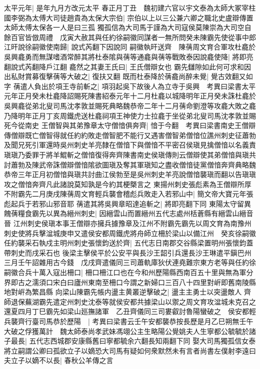 太平元年|{
	是年九月方改元太平}
春正月丁丑　魏初建六官以宇文泰為太師大冢宰柱國李弼為太傅大司徒趙貴為太保大宗伯|{
	宗伯以上以三公兼六卿之職北史盧辯傳置太師太傅太保各一人是曰三孤}
獨孤信為大司馬于謹為大司寇侯莫陳崇為大司空自餘百官皆倣周禮　戊寅大赦其與任約徐嗣徽同謀者一無所問癸未陳霸先使從事中郎江旰說徐嗣徽使南歸|{
	說式芮翻下因說同}
嗣徽執旰送齊　陳蒨周文育合軍攻杜龕於吳興龕勇而無謀嗜酒常醉其將杜泰隂與蒨等通龕與蒨等戰敗泰因說龕使降|{
	將即亮翻說式芮翻降戶江翻}
龕然之其妻王氏曰|{
	王氏僧辯女也}
霸先讎隙如此何可求和因出私財賞募復擊蒨等大破之|{
	復扶又翻}
既而杜泰降於蒨龕尚醉未覺|{
	覺古效翻又如字}
蒨遣人負出於項王寺前斬之|{
	項羽起吳下故後人為立寺于吳興　考異曰梁書太平元年正月癸未杜龕降詔賜死陳書紹泰元年十二月杜龕以城降明年正月癸未誅杜龕於吳興龕從弟北叟司馬沈孝敦並賜死典略魏恭帝二年十二月蒨命劉澄等攻龕大敗之龕乃降明年正月丁亥周鐵虎送杜龕祠項王神使力士拉龕于坐從弟北叟司馬沈孝敦並賜死今從南史}
王僧智與其弟豫章太守僧愔俱奔齊|{
	愔于今翻　考異曰梁書南史王僧辯傳僧辯既亡僧智得就任約約敗走僧智肥不能行又遇害僧智弟僧愔位譙州刺史征蕭勃及聞兄死引軍還時吳州刺史羊亮隸在僧愔下與僧愔不平密召侯瑱見擒僧愔以名義責瑱瑱乃委罪于將羊鯤斬之僧愔復得奔齊陳書南史侯瑱傳則云僧辯使其弟僧愔與瑱共討蕭勃及陳武帝誅僧辯僧愔隂欲圖瑱及奪其軍瑱知之盡收僧愔徒黨僧愔奔齊典略魏恭帝三年正月初僧愔與瑱共討曲江侯勃至是吳州刺史羊亮說僧愔襲瑱而翻以告瑱瑱攻之僧愔奔齊凡此諸說莫知孰是今約其梗槩言之}
東揚州刺史張彪素為王僧辯所厚不附霸先二月庚戌陳蒨周文育輕兵襲會稽彪兵敗走入若邪山中|{
	簡文帝大寶元年張彪起兵于若邪山邪音耶}
蒨遣其將吳興章昭達追斬之|{
	將即亮翻下同}
東陽太守留異餽蒨糧食霸先以異為縉州刺史|{
	因縉雲山而置縉州五代志處州栝蒼縣有縉雲山縉音晉}
江州刺史侯瑱本事王僧辯亦擁兵據豫章及江州不附霸先霸先以周文育為南豫州刺史使將兵擊湓城庚申又遣侯安都周鐵虎將舟師立柵於梁山以備江州　癸亥徐嗣徽任約襲采石執戍主明州刺史張懷鈞送於齊|{
	五代志日南郡交谷縣梁置明州張懷鈞蓋帶刺史而戌采石也}
後梁主擊侯平於公安平與長沙王韶引兵還長沙王琳遣平鎭巴州三月壬午詔雜用古今錢　戊戌齊遣儀同三司蕭軌庫狄伏連堯難宗東方老等與任約徐嗣徽合兵十萬入寇出柵口|{
	柵口柵江口也在今和州歷陽縣西南百五十里與無為軍分界即古之濡須口宋白曰廬州東南至柵口今謂之新婦口三百八十四里對㟁即舊南陵縣地對㟁為繁昌縣}
向梁山陳霸先帳内盪主黄叢逆擊破之|{
	盪主主勇士以突盪敵人}
齊師退保蕪湖霸先遣定州刺史沈泰等就侯安都共據梁山以禦之周文育攻湓城未克召之還夏四月丁巳霸先如梁山廵撫諸軍　乙丑齊儀同三司婁叡討魯陽蠻破之　侯安都輕兵襲齊行臺司馬恭於歷陽　|{
	考異曰梁書云壬午安都襲恭按長歷是月乙巳朔無壬午}
大破之俘獲萬計　魏太師泰尚孝武妹馮翊公主生略陽公覺姚夫人生寧都公毓毓於諸子最長|{
	五代志西城郡安康縣舊曰寧都毓余六翻長知兩翻下同}
娶大司馬獨孤信女泰將立嗣謂公卿曰孤欲立子以嫡恐大司馬有疑如何衆默然未有言者尚書左僕射李遠曰夫立子以嫡不以長|{
	春秋公羊傳之言}
